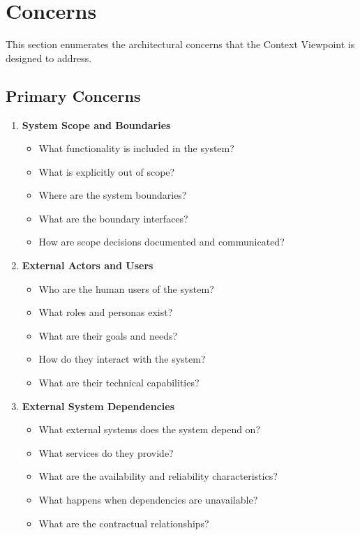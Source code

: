 \documentclass[11pt,letterpaper]{article}
\begin{document}
\section{Concerns}

This section enumerates the architectural concerns that the Context Viewpoint is designed to address.

\subsection{Primary Concerns}

\begin{enumerate}[label=\textbf{C\arabic*:}, leftmargin=2.5em]
    \item \textbf{System Scope and Boundaries}
    \begin{itemize}[nosep]
        \item What functionality is included in the system?
        \item What is explicitly out of scope?
        \item Where are the system boundaries?
        \item What are the boundary interfaces?
        \item How are scope decisions documented and communicated?
    \end{itemize}
    
    \item \textbf{External Actors and Users}
    \begin{itemize}[nosep]
        \item Who are the human users of the system?
        \item What roles and personas exist?
        \item What are their goals and needs?
        \item How do they interact with the system?
        \item What are their technical capabilities?
    \end{itemize}
    
    \item \textbf{External System Dependencies}
    \begin{itemize}[nosep]
        \item What external systems does the system depend on?
        \item What services do they provide?
        \item What are the availability and reliability characteristics?
        \item What happens when dependencies are unavailable?
        \item What are the contractual relationships?
    \end{itemize}
    

\end{enumerate}
\end{document}
